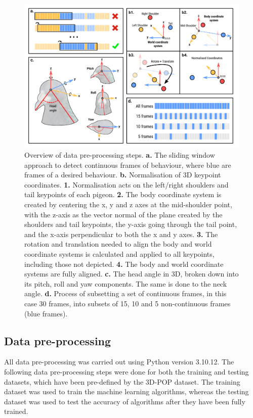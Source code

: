 \documentclass[11pt, letterpaper]{article} %
\begin{document}
    \begin{figure}
        \centering
        \includegraphics[width=1\linewidth]{methods_diagram.pdf}
        \caption{Overview of data pre-processing steps. \textbf{a.} The sliding window approach to detect continuous frames of behaviour, where blue are frames of a desired behaviour. \textbf{b.} Normalisation of 3D keypoint coordinates. \textbf{1.} Normalisation acts on the left/right shoulders and tail keypoints of each pigeon. \textbf{2.} The body coordinate system is created by centering the x, y and z axes at the mid-shoulder point, with the z-axis as the vector normal of the plane created by the shoulders and tail keypoints, the y-axis going through the tail point, and the x-axis perpendicular to both the x and y axes. \textbf{3.} The rotation and translation needed to align the body and world coordinate systems is calculated and applied to all keypoints, including those not depicted. \textbf{4.} The body and world coordinate systems are fully aligned. \textbf{c.} The head angle in 3D, broken down into its pitch, roll and yaw components. The same is done to the neck angle. \textbf{d.} Process of subsetting a set of continuous frames, in this case 30 frames, into subsets of 15, 10 and 5 non-continuous frames (blue frames).}
        \label{fig:methods_overview}
    \end{figure}


    \subsection{Data pre-processing}

    All data pre-processing was carried out using Python version 3.10.12. The following data pre-processing steps were done for both the training and testing datasets, which have been pre-defined by the 3D-POP dataset. The training dataset was used to train the machine learning algorithms, whereas the testing dataset was used to test the accuracy of algorithms after they have been fully trained.
\end{document}
